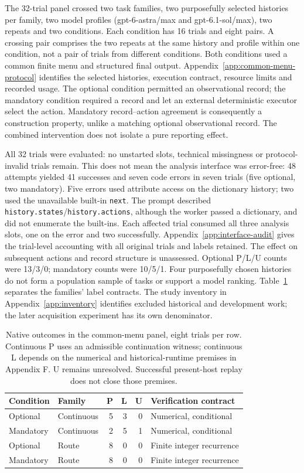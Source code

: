The 32-trial panel crossed two task families, two purposefully selected
histories per family, two model profiles (gpt-6-astra/max and gpt-6.1-sol/max),
two repeats and two conditions. Each condition has 16 trials and eight pairs.
A crossing pair comprises the two repeats at the same history and profile
within one condition, not a pair of trials from different conditions.
Both conditions used a common finite menu and structured final output.
Appendix~\ref{app:common-menu-protocol} identifies the selected histories,
execution contract, resource limits and recorded usage.
The optional condition permitted an observational record; the mandatory
condition required a record and let an external deterministic executor select
the action. Mandatory record--action agreement is consequently a construction
property, unlike a matching optional observational record. The combined
intervention does not isolate a pure reporting effect.

All 32 trials were evaluated: no unstarted slots, technical missingness or
protocol-invalid trials remain. This does not mean the analysis interface was
error-free: 48 attempts yielded 41 successes and seven code errors in seven
trials (five optional, two mandatory). Five errors used attribute access on
the dictionary history; two used the unavailable built-in \texttt{next}.
The prompt described \texttt{history.states}/\texttt{history.actions}, although
the worker passed a dictionary, and did not enumerate the built-ins.
Each affected trial consumed all three analysis slots, one on the error and
two successfully. Appendix~\ref{app:interface-audit} gives the trial-level
accounting with all original trials and labels retained. The effect on
subsequent actions and record structure is unassessed.
Optional P/L/U counts were 13/3/0; mandatory
counts were 10/5/1. Four purposefully chosen histories do not form a population
sample of tasks or support a model ranking. Table~\ref{tab:label-contracts}
separates the families' label contracts. The study inventory in
Appendix~\ref{app:inventory} identifies excluded historical and development
work; the later acquisition experiment has its own denominator.

\begin{table}[htbp]
\centering\small
\begin{tabular}{llrrrl}\toprule
Condition & Family & P & L & U & Verification contract\\\midrule
Optional & Continuous & 5 & 3 & 0 & Numerical, conditional\\
Mandatory & Continuous & 2 & 5 & 1 & Numerical, conditional\\
Optional & Route & 8 & 0 & 0 & Finite integer recurrence\\
Mandatory & Route & 8 & 0 & 0 & Finite integer recurrence\\\bottomrule
\end{tabular}
\caption{Native outcomes in the common-menu panel, eight trials per row.
Continuous P uses an admissible continuation witness; continuous L depends
on the numerical and historical-runtime premises in Appendix F. U remains
unresolved. Successful present-host replay does not close those premises.}
\label{tab:label-contracts}
\end{table}

